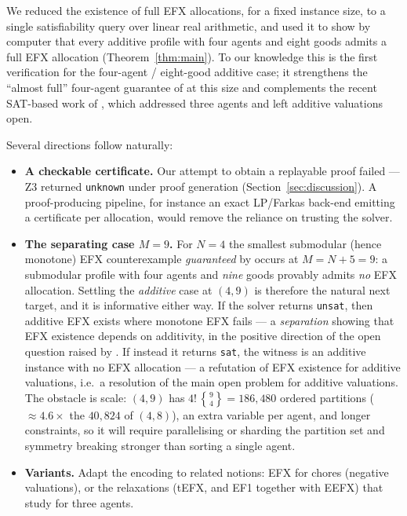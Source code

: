 \documentclass[11pt,a4paper]{article}
\theoremstyle{definition}
\theoremstyle{plain}
\newcommand{\EFX}{\textsf{EFX}}
\newcommand{\EFone}{\textsf{EF1}}
\newcommand{\agents}{N}
\newcommand{\goods}{M}
\begin{document}
We reduced the existence of full \EFX{} allocations, for a fixed instance size,
to a single satisfiability query over linear real arithmetic, and used it to show
by computer that every additive profile with four agents and eight goods admits a
full \EFX{} allocation (Theorem~\ref{thm:main}). To our knowledge this is the
first verification for the four-agent / eight-good additive case; it strengthens
the ``almost full'' four-agent guarantee of \cite{BergerCohenFeldmanFiat2022} at
this size and complements the recent SAT-based work of \cite{AkramiEtAl2026},
which addressed three agents and left additive valuations open.

Several directions follow naturally:
\begin{itemize}
  \item \textbf{A checkable certificate.} Our attempt to obtain a replayable proof
        failed --- Z3 returned \texttt{unknown} under proof generation
        (Section~\ref{sec:discussion}). A proof-producing pipeline, for instance an
        exact LP/Farkas back-end emitting a certificate per allocation, would
        remove the reliance on trusting the solver.
  \item \textbf{The separating case $\goods=9$.} For $\agents=4$ the smallest
        submodular (hence monotone) \EFX{} counterexample \emph{guaranteed} by
        \cite{AkramiEtAl2026} occurs at $\goods=\agents+5=9$: a submodular profile
        with four agents and \emph{nine} goods provably admits \emph{no} \EFX{}
        allocation.
        Settling the \emph{additive} case at $(4,9)$ is therefore the natural next
        target, and it is informative either way. If the solver
        returns \texttt{unsat}, then additive \EFX{} exists where monotone \EFX{}
        fails --- a \emph{separation} showing that \EFX{} existence depends on
        additivity, in the positive direction of the open question raised by
        \cite{AkramiEtAl2026}. If instead it returns \texttt{sat}, the
        witness is an additive instance with no \EFX{} allocation --- a refutation
        of \EFX{} existence for additive valuations, i.e.\ a resolution of the
        main open problem for additive valuations. The obstacle is scale: $(4,9)$ has
        $4!\,\genfrac{\{}{\}}{0pt}{}{9}{4}=186{,}480$ ordered partitions
        ($\approx 4.6\times$ the $40{,}824$ of $(4,8)$), an extra variable per
        agent, and longer constraints, so it will require parallelising or sharding
        the partition set and symmetry breaking stronger than sorting a single
        agent.
  \item \textbf{Variants.} Adapt the encoding to related notions: \EFX{} for
        chores (negative valuations), or the relaxations (tEFX, and \EFone{}
        together with EEFX) that \cite{AkramiEtAl2026} study for three agents.
\end{itemize}
\end{document}
